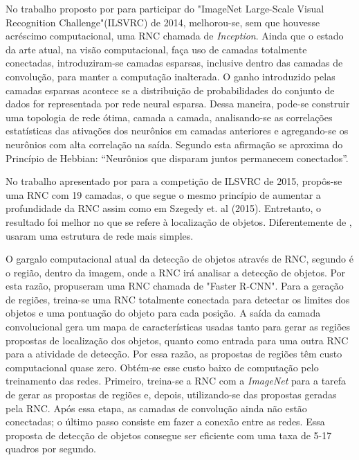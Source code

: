 \documentclass[
	12pt,				%
    oneside,			%
	a4paper,			%
	english,			%
	french,				%
	spanish,			%
	brazil,				%
	]{abntex2}
\begin{document}
No trabalho proposto por  para participar do "ImageNet Large-Scale Visual Recognition Challenge"(ILSVRC) de 2014, melhorou-se, sem que houvesse acréscimo computacional, uma RNC chamada de \textit{Inception}. Ainda que o estado da arte atual, na visão computacional, faça uso de camadas totalmente conectadas, introduziram-se camadas esparsas, inclusive dentro das camadas de convolução, para manter a computação inalterada. O ganho introduzido pelas camadas esparsas acontece se a distribuição de probabilidades do conjunto de dados for representada por rede neural esparsa. Dessa maneira, pode-se construir uma topologia de rede ótima, camada a camada, analisando-se as correlações estatísticas das ativações dos neurônios em camadas anteriores e agregando-se os neurônios com alta correlação na saída. Segundo  esta afirmação se aproxima do Princípio de Hebbian: “Neurônios que disparam juntos permanecem conectados”. 

No trabalho apresentado por  para a competição de ILSVRC de 2015, propôs-se uma RNC com 19 camadas, o que segue o mesmo princípio de aumentar a profundidade da RNC assim como em Szegedy et. al (2015). Entretanto, o resultado foi melhor no que se refere à localização de objetos. Diferentemente de ,  usaram uma estrutura de rede mais simples.

O gargalo computacional atual da detecção de objetos através de RNC, segundo   é o região, dentro da imagem, onde a RNC irá analisar a detecção de objetos. Por esta razão,  propuseram uma RNC chamada de "Faster R-CNN". Para a geração de regiões, treina-se uma RNC totalmente conectada para detectar os limites dos objetos e uma pontuação do objeto para cada posição. A saída da camada convolucional gera um mapa de características usadas tanto para gerar as regiões propostas de localização dos objetos, quanto como entrada para uma outra RNC para a atividade de detecção. Por essa razão, as propostas de regiões têm custo computacional quase  zero. Obtém-se esse custo baixo de computação pelo treinamento das redes. Primeiro, treina-se a RNC com a \textit{ImageNet} para a tarefa de gerar as propostas de regiões e, depois, utilizando-se das propostas geradas pela RNC. Após essa etapa, as camadas de convolução ainda não estão conectadas; o último passo consiste em fazer a conexão entre as redes. Essa proposta de detecção de objetos consegue ser eficiente com uma taxa de 5-17 quadros por segundo.
\end{document}
